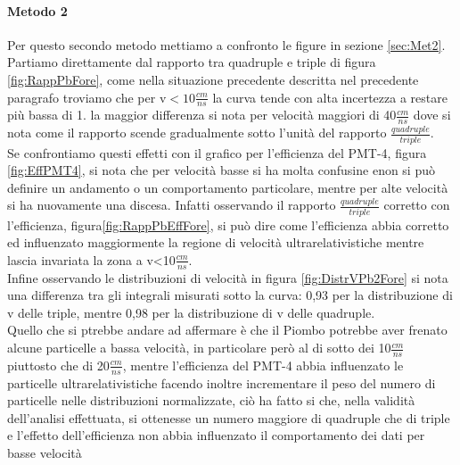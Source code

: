 \documentclass[a4paper]{article}
\begin{document}
\paragraph{Metodo 2}
Per questo secondo metodo mettiamo a confronto le figure in sezione \ref{sec:Met2}.\\
Partiamo direttamente dal rapporto tra quadruple e triple di figura \ref{fig:RappPbFore}, come nella situazione precedente descritta nel precedente paragrafo troviamo che per v$<10\frac{cm}{ns}$ la curva tende con alta incertezza a restare più bassa di 1. la maggior differenza si nota per velocità maggiori di 40$\frac{cm}{ns}$ dove si nota come il rapporto scende gradualmente sotto l'unità del rapporto $\frac{quadruple}{triple}$.\\
Se confrontiamo questi effetti con il grafico per l'efficienza del PMT-4, figura \ref{fig:EffPMT4}, si nota che per velocità basse si ha molta confusine enon si può definire un andamento o un comportamento particolare, mentre per alte velocità si ha nuovamente una discesa. Infatti osservando il rapporto $\frac{quadruple}{triple}$ corretto con l'efficienza, figura\ref{fig:RappPbEffFore}, si può dire come l'efficienza abbia corretto ed influenzato maggiormente la regione di velocità ultrarelativistiche mentre lascia invariata la zona a v<10$\frac{cm}{ns}$.\\
Infine osservando le distribuzioni di velocità in figura \ref{fig:DistrVPb2Fore} si nota una differenza tra gli integrali misurati sotto la curva: 0,93 per la distribuzione di v delle triple, mentre 0,98 per la distribuzione di v delle quadruple.\\
Quello che si ptrebbe andare ad affermare è che il Piombo potrebbe aver frenato alcune particelle a bassa velocità, in particolare però al di sotto dei 10$\frac{cm}{ns}$ piuttosto che di 20$\frac{cm}{ns}$, mentre l'efficienza del PMT-4 abbia influenzato le particelle ultrarelativistiche facendo inoltre incrementare il peso del numero di particelle nelle distribuzioni normalizzate, ciò ha fatto si che, nella validità dell'analisi effettuata, si ottenesse un numero maggiore di quadruple che di triple e l'effetto dell'efficienza non abbia influenzato il comportamento dei dati per basse velocità









\newpage
\appendix
\end{document}
